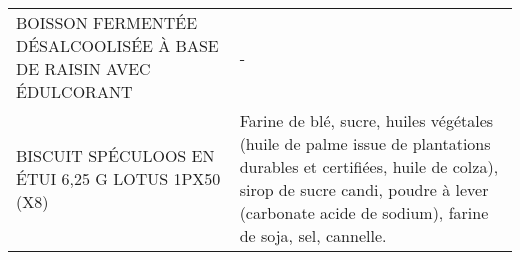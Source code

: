 \begin{longtable}{p{5cm}p{10cm}}
                                        BOISSON FERMENTÉE DÉSALCOOLISÉE À BASE DE RAISIN  AVEC ÉDULCORANT &                                                                                                                                                                                                                                                                                                                                                                                                                                                                                                                                                                                                                                                                                                                                                                                                                                                                                                                                                                                                                                        - \\
                                                        BISCUIT SPÉCULOOS EN ÉTUI 6,25 G LOTUS 1PX50 (X8) &                                                                                                                                                                                                                                                                                                                                                                                                                                                                                                                                                                                                                                                                                                                                                                                                                    Farine de blé, sucre, huiles végétales (huile de palme issue de plantations durables et certifiées, huile de colza), sirop de sucre candi, poudre à lever (carbonate acide de sodium), farine de soja, sel, cannelle. \\

\end{longtable}
